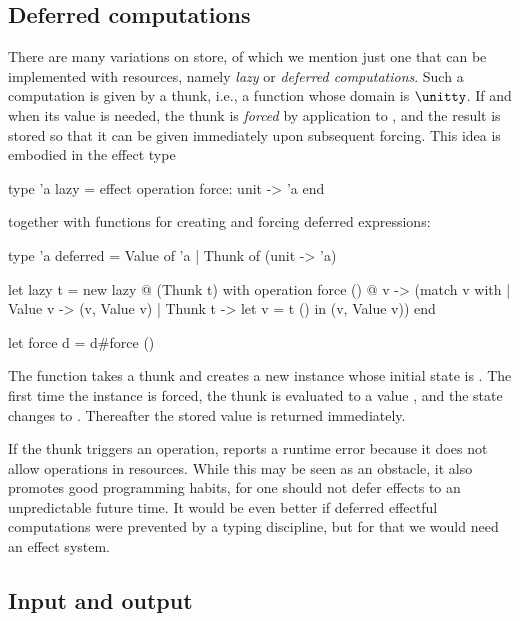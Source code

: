 \subsection{Deferred computations}

There are many variations on store, of which we mention just one that can be implemented with resources, namely \emph{lazy} or \emph{deferred computations}. Such a computation is given by a thunk, i.e., a function whose domain is $\unitty$. If and when its value is needed, the thunk is \emph{forced} by application to \inline{()}, and the result is stored so that it can be given immediately upon subsequent forcing. This idea is embodied in the effect type
%
\begin{source}
type 'a lazy = effect
  operation force: unit -> 'a
end 
\end{source}
%
together with functions for creating and forcing deferred expressions:
%
\begin{source}
type 'a deferred = Value of 'a | Thunk of (unit -> 'a)

let lazy t =
  new lazy @ (Thunk t) with
    operation force () @ v ->
      (match v with
        | Value v -> (v, Value v)
        | Thunk t -> let v = t () in (v, Value v))
  end

let force d = d#force ()
\end{source}
%
The function  takes a thunk  and creates a new instance whose initial state is . The first time the instance is forced, the thunk is evaluated to a value , and the state changes to . Thereafter the stored value is returned immediately.

If the thunk triggers an operation, \eff reports a runtime error because it does not allow operations in resources. While this may be seen as an obstacle, it also promotes good programming habits, for one should not defer effects to an unpredictable future time. It would be even better if deferred effectful computations were prevented by a typing discipline, but for that we would need an effect system.

\subsection{Input and output}

